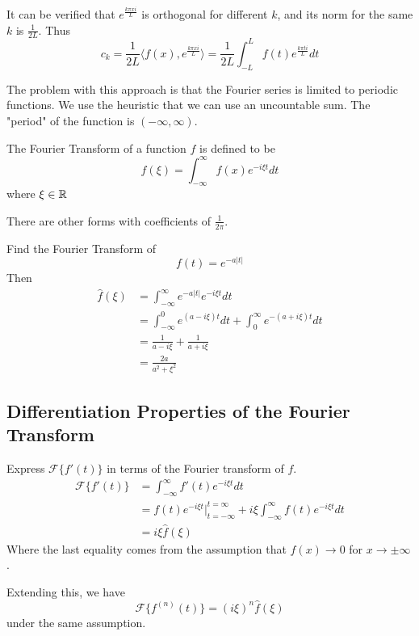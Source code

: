 \documentclass[12pt]{article}
\begin{document}
It can be verified that $e^{\frac{k\pi xi}{L}}$ is orthogonal for different $k$, and its norm for the same $k$ is $\frac{1}{2L}$. Thus
$$c_k = \frac{1}{2L}\langle f(x), e^{\frac{k\pi xi}{L}}\rangle = \frac{1}{2L}\int_{-L}^L f(t)e^{\frac{k\pi ti}{L}}dt$$

The problem with this approach is that the Fourier series is limited to periodic functions. We use the heuristic that we can use an uncountable sum. The "period" of the function is $(-\infty,\infty)$.

\begin{defn}
	The Fourier Transform of a function $f$ is defined to be
	$$\hat{f}(\xi) = \int_{-\infty}^\infty f(x)e^{-i\xi t}dt$$
	where $\xi\in\mathbb{R}$
\end{defn}
There are other forms with coefficients of $\frac{1}{2\pi}$.

\begin{ex}
	Find the Fourier Transform of
	$$f(t) = e^{-a|t|}$$
	Then
	\begin{align*}
		\hat{f}(\xi) &= \int_{-\infty}^\infty e^{-a|t|}e^{-i\xi t}dt \\
			     &= \int_{-\infty}^0 e^{(a-i\xi)t}dt + \int_0^\infty e^{-(a+i\xi)t}dt \\
			     &= \frac{1}{a-i\xi} + \frac{1}{a+i\xi} \\
			     &= \frac{2a}{a^2 + \xi^2}
	\end{align*}
\end{ex}

\subsection{Differentiation Properties of the Fourier Transform}

\begin{ex}
	Express $\mathcal{F}\{f'(t)\}$ in terms of the Fourier transform of $f$.
	\begin{align*}
		\mathcal{F}\{f'(t)\} &= \int_{-\infty}^\infty f'(t)e^{-i\xi t}dt \\
				      &= f(t)e^{-i\xi t} \Big |_{t=-\infty}^{t=\infty} + i\xi \int_{-\infty}^\infty f(t)e^{-i\xi t}dt \\
				      &= i\xi\hat{f}(\xi)
	\end{align*}
	Where the last equality comes from the assumption that $f(x) \rightarrow 0$ for $x \rightarrow \pm\infty$.
\end{ex}
Extending this, we have
$$\mathcal{F}\{f^{(n)}(t)\} = (i\xi)^n\hat{f}(\xi)$$
under the same assumption.
\end{document}
